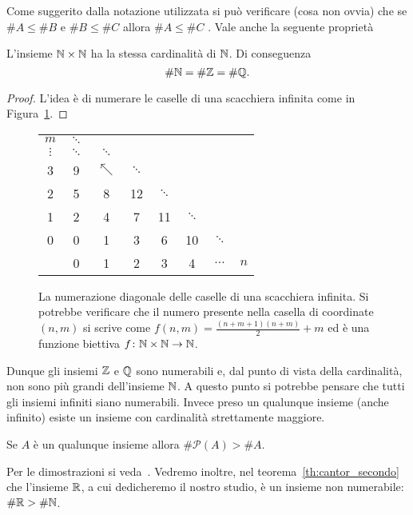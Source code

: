 Come suggerito dalla notazione utilizzata si può verificare (cosa non ovvia)
che se $\#A \le \#B$ e $\#B \le \#C$ allora $\#A \le \#C$
\cite[teorema di Cantor-Bernstein]{appunti_logica}.
Vale anche la seguente proprietà

\begin{theorem}
\label{th:Cantor_primo}%
%
  L'insieme $\mathbb N \times \mathbb N$ ha la stessa cardinalità di $\mathbb N$. Di conseguenza
  \[
    \# \mathbb N = \# \mathbb Z = \# \mathbb Q.
  \]
\end{theorem}
%
\begin{proof}
L'idea è di numerare le caselle di una scacchiera infinita
come in Figura~\ref{fig:cantor1}.
\end{proof}

\begin{figure}
  \begin{tabular}{c|ccccccc}
   $m$ & $\ddots$\\
   $\vdots$ & $\ddots$ & $\ddots$\\
   3 & 9 & $\nwarrow$ & $\ddots$ \\
   2 & 5 & 8 & 12 & $\ddots$ \\
   1 & 2 & 4 & 7 & 11 & $\ddots$ \\
   0 & 0 & 1 & 3 & 6 & 10 & $\ddots$ \\ \hline
     & 0 & 1 & 2 & 3 & 4 & $\dots$ & $n$
  \end{tabular}
  \caption{
    La numerazione diagonale delle caselle
    di una scacchiera infinita. Si potrebbe verificare
    che il numero presente nella casella di coordinate $(n,m)$
    si scrive come $f(n,m) = \frac{(n+m+1)(n+m)}{2}+m$
    ed è una funzione biettiva $f\colon \mathbb N\times\mathbb N \to\mathbb N$.}
  \label{fig:cantor1}
\end{figure}

Dunque gli insiemi $\mathbb Z$ e $\mathbb Q$ sono numerabili e, dal punto di vista della cardinalità,
non sono più grandi dell'insieme $\mathbb N$.
A questo punto si potrebbe pensare che
tutti gli insiemi infiniti siano numerabili.
Invece preso un qualunque insieme (anche infinito)
esiste un insieme con cardinalità strettamente maggiore.
%
\begin{theorem}[Cantor]
  Se $A$ è un qualunque insieme allora $\# \mathcal P(A)> \# A$.
\end{theorem}
Per le dimostrazioni si veda~\cite{appunti_logica}.
%
Vedremo inoltre, nel teorema~\ref{th:cantor_secondo}
che l'insieme $\mathbb R$, a cui dedicheremo il nostro studio,
è un insieme non numerabile: $\#\mathbb R > \#\mathbb N$.

